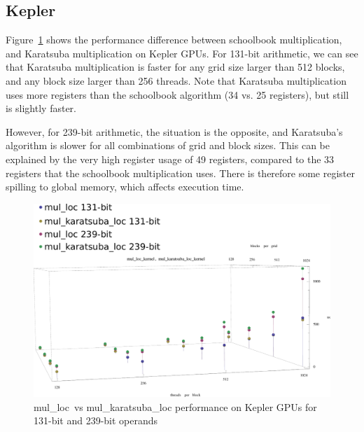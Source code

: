 \documentclass[12pt, a4paper]{report}
\begin{document}
\subsection{Kepler}
Figure~\ref{fig:mul_loc_vs_mul_karatsuba_loc_kepler_131_vs_239_duration} shows the
performance difference between schoolbook multiplication, and Karatsuba multiplication on Kepler GPUs.
For 131-bit arithmetic, we can see that Karatsuba multiplication is faster for
any grid size larger than 512 blocks, and any block size larger than 256 threads.
Note that Karatsuba multiplication uses more registers than the schoolbook algorithm (34 vs. 25 registers), but still is slightly faster.

However, for 239-bit arithmetic, the situation is the opposite, and Karatsuba's algorithm
is slower for all combinations of grid and block sizes. This can be explained by the
very high register usage of 49 registers, compared to the 33 registers that the schoolbook
multiplication uses.
There is therefore some register spilling to global memory, which affects execution time.

\begin{figure}[h]
\centering
\includegraphics[scale=0.5]{figs/mul_loc_vs_mul_karatsuba_loc_kepler_131_vs_239_duration}
\caption{mul\_loc\ vs mul\_karatsuba\_loc performance on Kepler GPUs for 131-bit and 239-bit operands}
\label{fig:mul_loc_vs_mul_karatsuba_loc_kepler_131_vs_239_duration}
\end{figure}
\end{document}
